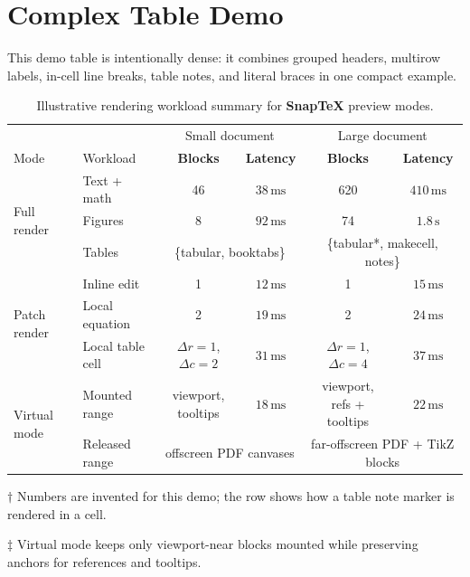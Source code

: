 \documentclass{article}
\newcommand{\snaptex}{SnapTeX}
\newcommand{\ms}{\mathrm{ms}}
\begin{document}
\section{Complex Table Demo}

This demo table is intentionally dense: it combines grouped headers, multirow
labels, in-cell line breaks, table notes, and literal braces in one compact
example.

\begin{table}[!ht]
\setlength\tabcolsep{0.6em}
\begin{threeparttable}
\caption{Illustrative rendering workload summary for \textbf{\snaptex} preview modes.}
\label{tab:demo-complex-table}
\centering
\begin{tabular*}{\textwidth}{l@{\extracolsep{\fill}}lcccc}
\toprule
&& \multicolumn{2}{c}{Small document} & \multicolumn{2}{c}{Large document} \\
\cmidrule(lr){3-4}\cmidrule(lr){5-6}
Mode & Workload & \textbf{Blocks} & \textbf{Latency} & \textbf{Blocks} & \textbf{Latency} \\
\midrule
\multirow{3}{*}{Full render}
& Text + math & 46 & $38\,\ms$ & 620 & $410\,\ms$ \\
& Figures & 8 & $92\,\ms$ & 74 & $1.8\,\mathrm{s}$\tnote{$\dagger$} \\
& Tables & \multicolumn{2}{c}{\{tabular, booktabs\}} & \multicolumn{2}{c}{\{tabular*, makecell, notes\}} \\
\cline{2-6}
\multirow{3}{*}{Patch render}
& Inline edit & 1 & $12\,\ms$ & 1 & $15\,\ms$ \\
& Local equation & 2 & $19\,\ms$ & 2 & $24\,\ms$ \\
& Local table cell & \makecell{$\Delta r=1$,\\ $\Delta c=2$} & $31\,\ms$ & \makecell{$\Delta r=1$,\\ $\Delta c=4$} & $37\,\ms$ \\
\cline{2-6}
\multirow{2}{*}{Virtual mode}
& Mounted range & \makecell{viewport,\\ tooltips} & $18\,\ms$ & \makecell{viewport,\\ refs + tooltips} & $22\,\ms$\tnote{$\ddagger$} \\
& Released range & \multicolumn{2}{c}{offscreen PDF canvases} & \multicolumn{2}{c}{far-offscreen PDF + TikZ blocks} \\
\bottomrule
\end{tabular*}
\begin{tablenotes}[flushleft]\footnotesize
    \item[$\dagger$] Numbers are invented for this demo; the row shows how a table note marker is rendered in a cell.
    \item[$\ddagger$] Virtual mode keeps only viewport-near blocks mounted while preserving anchors for references and tooltips.
\end{tablenotes}
\end{threeparttable}
\end{table}
\end{document}
